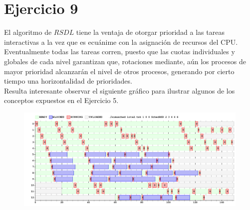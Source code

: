 \section{Ejercicio 9}

El algoritmo de $RSDL$ tiene la ventaja de otorgar prioridad a las tareas interactivas a la vez que es ecuánime con la asignación de recursos del CPU. Eventualmente todas las tareas corren, puesto que las cuotas individuales y globales de cada nivel garantizan que, rotaciones mediante, aún los procesos de mayor prioridad alcanzarán el nivel de otros procesos, generando por cierto tiempo una horizontalidad de prioridades.\\
\indent Resulta interesante observar el siguiente gráfico para ilustrar algunos de los conceptos expuestos en el Ejercicio 5.

\begin{figure}[h]
	\centering                                                       
	\includegraphics[width=450pt]{./figs/ej91.png}
\end{figure}

